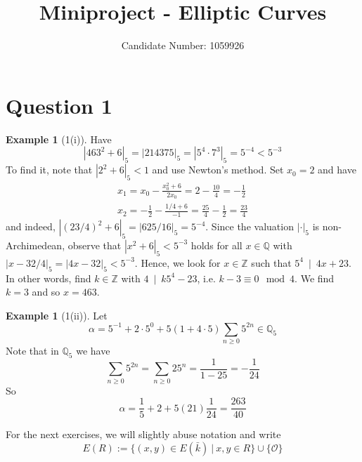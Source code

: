 \documentclass{scrartcl}
\title{Miniproject - Elliptic Curves}
\author{Candidate Number: 1059926}
\newcommand{\Z}{\mathbb{Z}}
\newcommand{\Q}{\mathbb{Q}}
\renewcommand{\O}{\mathcal{O}}
\newcommand{\divides}{\ \mid \ }
\theoremstyle{definition}
\newtheorem{example}[subsection]{Example}
\begin{document}
\maketitle
\listoftheorems

\section{Question 1}

\begin{example}[1(i)]
    Have
    \begin{equation*}
        |463^2 + 6|_5 = |214375|_5 = |5^4 \cdot 7^3|_5 = 5^{-4} < 5^{-3}
    \end{equation*}
    To find it, note that $|2^2 + 6|_5 < 1$ and use Newton's method.
    Set $x_0 = 2$ and have
    \begin{align*}
        x_1 = x_0 - \frac {x_0^2 + 6} {2x_0} = 2 - \frac {10} {4} = -\frac 1 2  \\
        x_2 = -\frac 1 2 - \frac {1/4 + 6} {-1} = \frac {25} 4 - \frac 1 2 = \frac {23} 4
    \end{align*}
    and indeed, $|(23/4)^2 + 6|_5 = |625/16|_5 = 5^{-4}$.
    Since the valuation $|\cdot|_5$ is non-Archimedean, observe that $|x^2 + 6|_5 < 5^{-3}$ holds for all $x \in \Q$ with $|x - 32/4|_5 = |4x - 32|_5 < 5^{-3}$.
    Hence, we look for $x \in \Z$ such that $5^4 \divides 4x + 23$.
    In other words, find $k \in \Z$ with $4 \divides k 5^4 - 23$, i.e. $k - 3 \equiv 0 \mod 4$.
    We find $k = 3$ and so $x = 463$.
\end{example}
\begin{example}[1(ii)]
    Let
    \begin{equation*}
        \alpha = 5^{-1} + 2 \cdot 5^0 + 5 (1 + 4 \cdot 5) \sum_{n \geq 0} 5^{2n} \in \Q_5
    \end{equation*}
    Note that in $\Q_5$ we have
    \begin{equation*}
        \sum_{n \geq 0} 5^{2n} = \sum_{n \geq 0} 25^n = \frac 1 {1 - 25} = -\frac 1 {24}
    \end{equation*}
    So
    \begin{equation*}
        \alpha = \frac 1 5 + 2 + 5 (21) \frac 1 {24} = \frac {263} {40}
    \end{equation*}
\end{example}
For the next exercises, we will slightly abuse notation and write
\begin{equation*}
    E(R) := \{ (x, y) \in E(\bar{k}) \ | \ x, y \in R \} \cup \{\O\}
\end{equation*}
\end{document}
